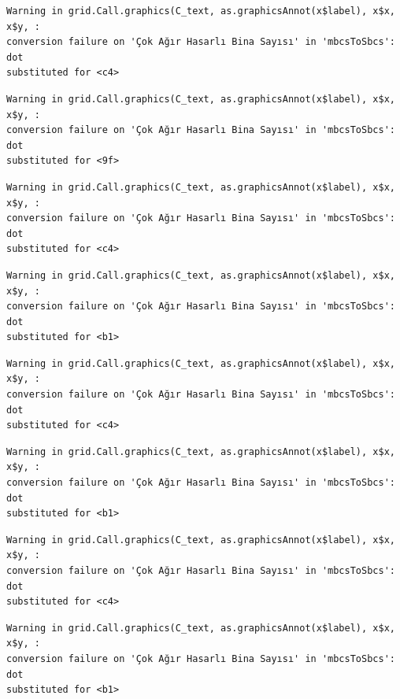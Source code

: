 \documentclass[
  11pt,
  a4paper,
  DIV=11,
  numbers=noendperiod]{scrartcl}
\begin{document}
\begin{verbatim}
Warning in grid.Call.graphics(C_text, as.graphicsAnnot(x$label), x$x, x$y, :
conversion failure on 'Çok Ağır Hasarlı Bina Sayısı' in 'mbcsToSbcs': dot
substituted for <c4>
\end{verbatim}

\begin{verbatim}
Warning in grid.Call.graphics(C_text, as.graphicsAnnot(x$label), x$x, x$y, :
conversion failure on 'Çok Ağır Hasarlı Bina Sayısı' in 'mbcsToSbcs': dot
substituted for <9f>
\end{verbatim}

\begin{verbatim}
Warning in grid.Call.graphics(C_text, as.graphicsAnnot(x$label), x$x, x$y, :
conversion failure on 'Çok Ağır Hasarlı Bina Sayısı' in 'mbcsToSbcs': dot
substituted for <c4>
\end{verbatim}

\begin{verbatim}
Warning in grid.Call.graphics(C_text, as.graphicsAnnot(x$label), x$x, x$y, :
conversion failure on 'Çok Ağır Hasarlı Bina Sayısı' in 'mbcsToSbcs': dot
substituted for <b1>
\end{verbatim}

\begin{verbatim}
Warning in grid.Call.graphics(C_text, as.graphicsAnnot(x$label), x$x, x$y, :
conversion failure on 'Çok Ağır Hasarlı Bina Sayısı' in 'mbcsToSbcs': dot
substituted for <c4>
\end{verbatim}

\begin{verbatim}
Warning in grid.Call.graphics(C_text, as.graphicsAnnot(x$label), x$x, x$y, :
conversion failure on 'Çok Ağır Hasarlı Bina Sayısı' in 'mbcsToSbcs': dot
substituted for <b1>
\end{verbatim}

\begin{verbatim}
Warning in grid.Call.graphics(C_text, as.graphicsAnnot(x$label), x$x, x$y, :
conversion failure on 'Çok Ağır Hasarlı Bina Sayısı' in 'mbcsToSbcs': dot
substituted for <c4>
\end{verbatim}

\begin{verbatim}
Warning in grid.Call.graphics(C_text, as.graphicsAnnot(x$label), x$x, x$y, :
conversion failure on 'Çok Ağır Hasarlı Bina Sayısı' in 'mbcsToSbcs': dot
substituted for <b1>
\end{verbatim}
\end{document}
